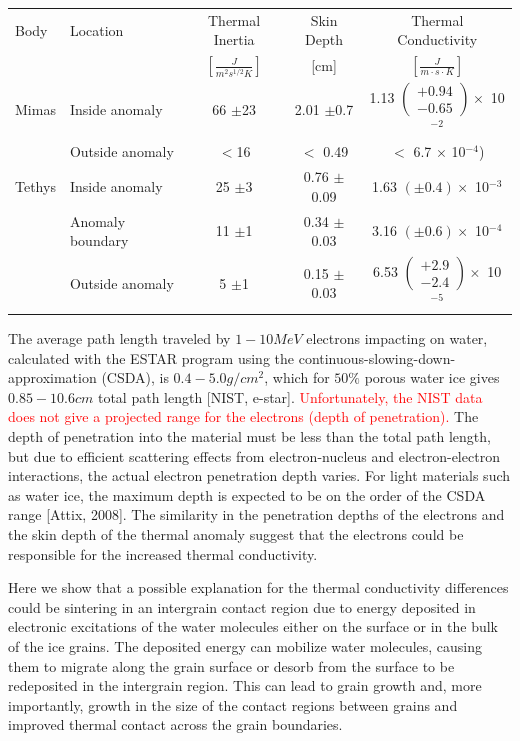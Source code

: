 \documentclass[11pt]{article} %
\begin{document}
\begin{itemize}
	\begin{tabular}[c]{ l | l | c | c | c }
	Body & Location & Thermal Inertia & Skin Depth & Thermal Conductivity \\
	& & $\left[ \frac{J}{m^{2} s^{1/2} K} \right]$ & [cm] & $\left[ \frac{J}{m\cdot s\cdot K} \right]$ \\ \hline
	Mimas & Inside anomaly & 66 $\pm$23 & 2.01 $\pm$0.7 & 1.13 $\left(\substack{+0.94 \\ -0.65} \right) \times$ 10$^{-2}$ \\
		& Outside anomaly & $<$16 & $<$ 0.49 & $<$ 6.7 $\times$ 10$^{-4}$) \\ \hline
	Tethys & Inside anomaly & 25 $\pm$3 & 0.76 $\pm$0.09 & 1.63 $(\pm 0.4) \times$ 10$^{-3}$ \\
		& Anomaly boundary & 11 $\pm$1 & 0.34 $\pm$0.03 & 3.16 $(\pm 0.6) \times$ 10$^{-4}$ \\
		& Outside anomaly & 5 $\pm$1 & 0.15 $\pm$0.03 & 6.53 $\left(\substack{+2.9 \\ -2.4} \right) \times$ 10$^{-5}$ \\
	\end{tabular}

	The average path length traveled by $1 - 10 MeV$ electrons impacting on water, calculated with the ESTAR program using the continuous-slowing-down-approximation (CSDA), is $0.4-5.0 g/cm^{2}$, which for $50\%$ porous water ice gives $0.85-10.6 cm$ total path length [NIST, e-star]. \textcolor{red}{Unfortunately, the NIST data does not give a projected range for the electrons (depth of penetration).} The depth of penetration into the material must be less than the total path length, but due to efficient scattering effects from electron-nucleus and electron-electron interactions, the actual electron penetration depth varies. For light materials such as water ice, the maximum depth is expected to be on the order of the CSDA range [Attix, 2008]. The similarity in the penetration depths of the electrons and the skin depth of the thermal anomaly suggest that the electrons could be responsible for the increased thermal conductivity.  
	
	Here we show that a possible explanation for the thermal conductivity differences could be sintering in an intergrain contact region due to energy deposited in electronic excitations of the water molecules either on the surface or in the bulk of the ice grains. The deposited energy can mobilize water molecules, causing them to migrate along the grain surface or desorb from the surface to be redeposited in the intergrain region. This can lead to grain growth and, more importantly, growth in the size of the contact regions between grains and improved thermal contact  across the grain boundaries.
	

\end{itemize}
\end{document}
